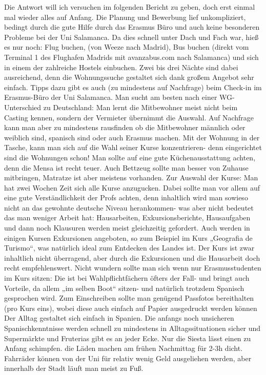 Die Antwort will ich versuchen im folgenden Bericht zu geben, doch erst einmal mal wieder alles auf Anfang. Die Planung und Bewerbung lief unkompliziert, bedingt durch die gute Hilfe durch das Erasmus Büro und auch keine besonderen Probleme bei der Uni Salamanca. Da dies schnell unter Dach und Fach war, hieß es nur noch: Flug buchen, (von Weeze nach Madrid), Bus buchen (direkt vom Terminal 1 des Flughafen Madrids mit avanzabus.com nach Salamanca) und sich in einem der zahlreiche Hostels einbuchen. Zwei bis drei Nächte sind dabei ausreichend, denn die Wohnungssuche gestaltet sich dank großem Angebot sehr einfach. Tipps dazu gibt es auch (zu mindestens auf Nachfrage) beim Check-in im Erasmus-Büro der Uni Salamanca. Man sucht am besten nach einer WG- Unterschied zu Deutschland: Man lernt die Mitbewohner meist nicht beim Casting kennen, sondern der Vermieter übernimmt die Auswahl. Auf Nachfrage kann man aber zu mindestens rausfinden ob die Mitbewohner männlich oder weiblich sind, spanisch sind oder auch Erasmus machen. Mit der Wohnung in der Tasche, kann man sich auf die Wahl seiner Kurse konzentrieren- denn eingerichtet sind die Wohnungen schon! Man sollte auf eine gute Küchenausstattung achten, denn die Mensa ist recht teuer. Auch Bettzeug sollte man besser von Zuhause mitbringen, Matratze ist aber meistens vorhanden. 
Zur Auswahl der Kurse: Man hat zwei Wochen Zeit sich alle Kurse anzugucken. Dabei sollte man vor allem auf eine gute Verständlichkeit der Profs achten, denn inhaltlich wird man sowieso nicht an das gewohnte deutsche Niveau herankommen- was aber nicht bedeutet das man weniger Arbeit hat: Hausarbeiten, Exkursionsberichte, Hausaufgaben und dann noch Klausuren werden meist gleichzeitig gefordert. Auch werden in einigen Kursen Exkursionen angeboten, so zum Beispiel im Kurs „Geografia de Turismo“, was natürlich ideal zum Entdecken des Landes ist. Der Kurs ist zwar inhaltlich nicht überragend, aber durch die Exkursionen und die Hausarbeit doch recht empfehlenswert. Nicht wundern sollte man sich wenn nur Erasmusstudenten im Kurs sitzen: Die ist bei Wahlpflichtfächern öfters der Fall- und bringt auch Vorteile, da allem „im selben Boot“ sitzen- und natürlich trotzdem Spanisch gesprochen wird. Zum Einschreiben sollte man genügend Passfotos bereithalten (pro Kurs eins), wobei diese auch einfach auf Papier ausgedruckt werden können 
Der Alltag gestaltet sich einfach in Spanien. Die anfangs noch unsicheren Spanischkenntnisse werden schnell zu mindestens in Alltagssituationen sicher und Supermärkte und Fruterias gibt es an jeder Ecke. Nur die Siesta lässt einen zu Anfang schimpfen. die Läden machen am frühen Nachmittag für 2-3h dicht. Fahrräder können von der Uni für relativ wenig Geld ausgeliehen werden, aber innerhalb der Stadt läuft man meist zu Fuß. 

